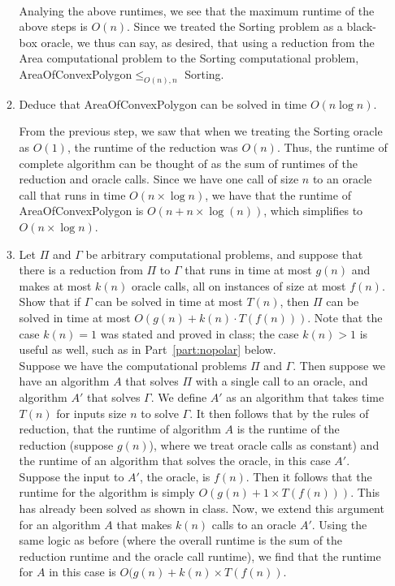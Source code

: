\documentclass[11pt]{article}
\begin{document}
\begin{enumerate}
\begin{enumerate}
\begin{enumerate}[i]
        \end{enumerate}\\
        
        Analying the above runtimes, we see that the maximum runtime of the above steps is $O(n)$. Since we treated the Sorting problem as a black-box oracle, we thus can say, as desired, that using a reduction from the Area computational problem to the Sorting computational problem, AreaOfConvexPolygon$\leq_{O(n),n}$ Sorting.
        
        \item Deduce that AreaOfConvexPolygon can be solved in time $O(n\log n)$.
        
        From the previous step, we saw that when we treating the Sorting oracle as $O(1)$, the runtime of the reduction was $O(n)$. Thus, the runtime of complete algorithm can be thought of as the sum of runtimes of the reduction and oracle calls. Since we have one call of size $n$ to an oracle call that runs in time $O(n \times \log n)$, we have that the runtime of AreaOfConvexPolygon is $O(n + n \times \log(n))$, which simplifies to $O(n \times \log n)$. 


        \item Let $\Pi$ and $\Gamma$ be arbitrary computational problems, and suppose that there is a reduction from $\Pi$ to $\Gamma$ that runs in time at most $g(n)$ and makes at most $k(n)$ oracle calls, all on instances of size at most $f(n)$.  Show that if $\Gamma$ can be solved in time at most $T(n)$, then $\Pi$ can be solved in time at most $O(g(n)+k(n)\cdot T(f(n)))$. Note that the case $k(n)=1$ was stated and proved in class; the case $k(n)>1$ is useful as well, such as in Part~\ref{part:nopolar} below.  \\
        
        Suppose we have the computational problems $\Pi$ and $\Gamma$. Then suppose we have an algorithm $A$ that solves $\Pi$ with a single call to an oracle, and algorithm $A'$ that solves $\Gamma$. We define $A'$ as an algorithm that takes time $T(n)$ for inputs size $n$ to solve $\Gamma$. It then follows that by the rules of reduction, that the runtime of algorithm $A$ is the runtime of the reduction (suppose $g(n)$), where we treat oracle calls as constant) and the runtime of an algorithm that solves the oracle, in this case $A'$. Suppose the input to $A'$, the oracle, is $f(n)$. Then it follows that the runtime for the algorithm is simply $O(g(n) + 1 \times T(f(n)))$. This has already been solved as shown in class. Now, we extend this argument for an algorithm $A$ that makes $k(n)$ calls to an oracle $A'$. Using the same logic as before (where the overall runtime is the sum of the reduction runtime and the oracle call runtime), we find that the runtime for $A$ in this case is $O(g(n) + k(n) \times T(f(n))$.
        

\end{enumerate}
\end{enumerate}
\end{document}
